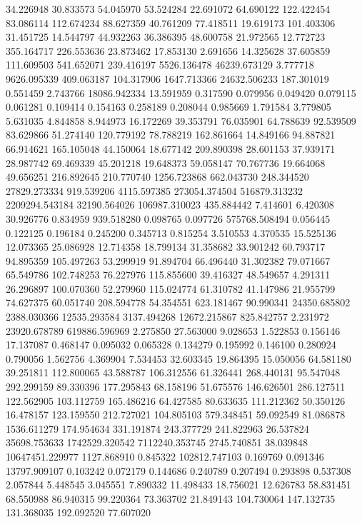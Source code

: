 34.226948
30.833573
54.045970
53.524284
22.691072
64.690122
122.422454
83.086114
112.674234
88.627359
40.761209
77.418511
19.619173
101.403306
31.451725
14.544797
44.932263
36.386395
48.600758
21.972565
12.772723
355.164717
226.553636
23.873462
17.853130
2.691656
14.325628
37.605859
111.609503
541.652071
239.416197
5526.136478
46239.673129
3.777718
9626.095339
409.063187
104.317906
1647.713366
24632.506233
187.301019
0.551459
2.743766
18086.942334
13.591959
0.317590
0.079956
0.049420
0.079115
0.061281
0.109414
0.154163
0.258189
0.208044
0.985669
1.791584
3.779805
5.631035
4.844858
8.944973
16.172269
39.353791
76.035901
64.788639
92.539509
83.629866
51.274140
120.779192
78.788219
162.861664
14.849166
94.887821
66.914621
165.105048
44.150064
18.677142
209.890398
28.601153
37.939171
28.987742
69.469339
45.201218
19.648373
59.058147
70.767736
19.664068
49.656251
216.892645
210.770740
1256.723868
662.043730
248.344520
27829.273334
919.539206
4115.597385
273054.374504
516879.313232
2209294.543184
32190.564026
106987.310023
435.884442
7.414601
6.420308
30.926776
0.834959
939.518280
0.098765
0.097726
575768.508494
0.056445
0.122125
0.196184
0.245200
0.345713
0.815254
3.510553
4.370535
15.525136
12.073365
25.086928
12.714358
18.799134
31.358682
33.901242
60.793717
94.895359
105.497263
53.299919
91.894704
66.496440
31.302382
79.071667
65.549786
102.748253
76.227976
115.855600
39.416327
48.549657
4.291311
26.296897
100.070360
52.279960
115.024774
61.310782
41.147986
21.955799
74.627375
60.051740
208.594778
54.354551
623.181467
90.990341
24350.685802
2388.030366
12535.293584
3137.494268
12672.215867
825.842757
2.231972
23920.678789
619886.596969
2.275850
27.563000
9.028653
1.522853
0.156146
17.137087
0.468147
0.095032
0.065328
0.134279
0.195992
0.146100
0.280924
0.790056
1.562756
4.369904
7.534453
32.603345
19.864395
15.050056
64.581180
39.251811
112.800065
43.588787
106.312556
61.326441
268.440131
95.547048
292.299159
89.330396
177.295843
68.158196
51.675576
146.626501
286.127511
122.562905
103.112759
165.486216
64.427585
80.633635
111.212362
50.350126
16.478157
123.159550
212.727021
104.805103
579.348451
59.092549
81.086878
1536.611279
174.954634
331.191874
243.377729
241.822963
26.537824
35698.753633
1742529.320542
7112240.353745
2745.740851
38.039848
10647451.229977
1127.868910
0.845322
102812.747103
0.169769
0.091346
13797.909107
0.103242
0.072179
0.144686
0.240789
0.207494
0.293898
0.537308
2.057844
5.448545
3.045551
7.890332
11.498433
18.756021
12.626783
58.831451
68.550988
86.940315
99.220364
73.363702
21.849143
104.730064
147.132735
131.368035
192.092520
77.607020
